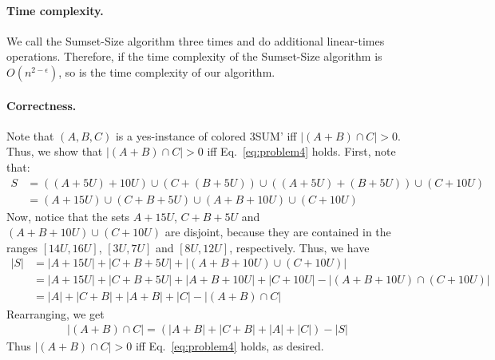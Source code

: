 \paragraph{Time complexity.} 
We call the Sumset-Size algorithm three times and do additional linear-times operations. 
Therefore, if the time complexity of the Sumset-Size algorithm is $O(n^{2-\epsilon})$, so is the time complexity of our algorithm.



\paragraph{Correctness.} 
Note that $(A, B, C)$ is a yes-instance of colored 3SUM' iff $|(A+B) \cap C| > 0$. 
Thus, we show that $|(A+B) \cap C| > 0$ iff Eq.~\eqref{eq:problem4} holds.
First, note that: 
\begin{align*}
    S 
    &= ((A+5U) + 10U) \cup  (C+(B+5U)) \cup  ((A+5U)+(B+5U)) \cup (C+10U) \\
    &= (A+15U) \cup  (C+B+5U) \cup  (A+B+10U) \cup (C+10U)
\end{align*}
Now, notice that the sets $A+15U$, $C+B+5U$ and $(A+B+10U) \cup (C+10U)$ are disjoint, because they are contained in the ranges $[14U, 16U]$, $[3U, 7U]$ and $[8U, 12U]$, respectively.
Thus, we have 
\begin{align*}
    |S| 
    &= |A+15U| + |C+B+5U| + |(A+B+10U) \cup (C+10U)| \\
    &= |A+15U| + |C+B+5U| + |A+B+10U| + |C+10U| -  |(A+B+10U) \cap (C+10U)| \\
    &= |A| + |C+B| + |A+B| + |C| -  |(A+B) \cap C|
\end{align*}
Rearranging, we get
\begin{align*}
    |(A+B) \cap C| = \left( |A+B| + |C+B| + |A| + |C| \right) - |S|
\end{align*}
Thus $|(A+B) \cap C| > 0$ iff Eq.~\eqref{eq:problem4} holds, as desired.




